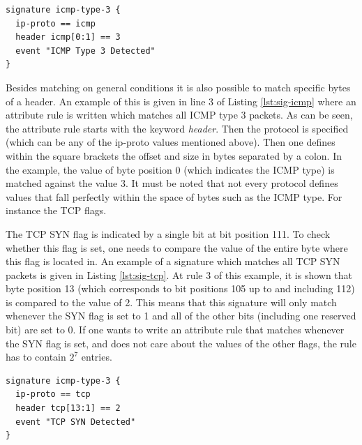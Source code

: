 \begin{lstlisting}[caption={Bro signature which matches all ICMP type 3 packets}, label={lst:sig-icmp}]
signature icmp-type-3 {
  ip-proto == icmp  
  header icmp[0:1] == 3
  event "ICMP Type 3 Detected"
}
\end{lstlisting} 

Besides matching on general conditions it is also possible to match specific bytes of a header. An example of this is given in line 3 of Listing \ref{lst:sig-icmp} where an attribute rule is written which matches all ICMP type 3 packets. As can be seen, the attribute rule starts with the keyword \emph{header}. Then the protocol is specified (which can be any of the ip-proto values mentioned above). Then one defines within the square brackets the offset and size in bytes separated by a colon. In the example, the value of byte position 0  (which indicates the ICMP type) is matched against the value 3. It must be noted that not every protocol defines values that fall perfectly within the space of bytes such as the ICMP type. For instance the TCP flags. 

The TCP SYN flag is indicated by a single bit at bit position 111. To check whether this flag is set, one needs to compare the value of the entire byte where this flag is located in. An example of a signature which matches all TCP SYN packets is given in Listing \ref{lst:sig-tcp}. At rule 3 of this example, it is shown that byte position 13 (which corresponds to bit positions 105 up to and including 112) is compared to the value of 2. This means that this signature will only match whenever the SYN flag is set to 1 and all of the other bits (including one reserved bit) are set to 0. If one wants to write an attribute rule that matches whenever the SYN flag is set, and does not care about the values of the other flags, the rule has to contain $2^7$ entries. 


\begin{lstlisting}[caption={Bro signature which matches all TCP SYN packets targeted at port 80}, label={lst:sig-tcp}]
signature icmp-type-3 {
  ip-proto == tcp  
  header tcp[13:1] == 2
  event "TCP SYN Detected"
}
\end{lstlisting} 

